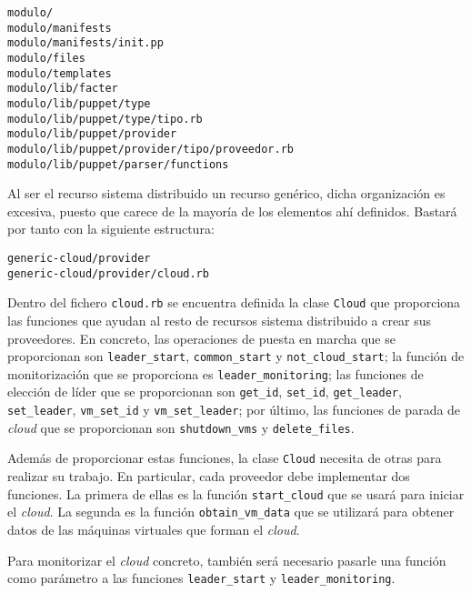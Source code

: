 \begin{lstlisting}
modulo/
modulo/manifests
modulo/manifests/init.pp
modulo/files
modulo/templates
modulo/lib/facter
modulo/lib/puppet/type
modulo/lib/puppet/type/tipo.rb
modulo/lib/puppet/provider
modulo/lib/puppet/provider/tipo/proveedor.rb
modulo/lib/puppet/parser/functions
\end{lstlisting}

Al ser el recurso sistema distribuido un recurso genérico, dicha organización es excesiva, puesto que carece de la mayoría de los elementos ahí definidos. Bastará por tanto con la siguiente estructura:

\begin{lstlisting}
generic-cloud/provider
generic-cloud/provider/cloud.rb
\end{lstlisting}

Dentro del fichero \texttt{cloud.rb} se encuentra definida la clase \texttt{Cloud} que proporciona las funciones que ayudan al resto de recursos sistema distribuido a crear sus proveedores. En concreto, las operaciones de puesta en marcha que se proporcionan son \texttt{leader\_start}, \texttt{common\_start} y \texttt{not\_cloud\_start}; la función de monitorización que se proporciona es \texttt{leader\_monitoring}; las funciones de elección de líder que se proporcionan son \texttt{get\_id}, \texttt{set\_id}, \texttt{get\_leader}, \texttt{set\_leader}, \texttt{vm\_set\_id} y \texttt{vm\_set\_leader}; por último, las funciones de parada de \emph{cloud} que se proporcionan son \texttt{shutdown\_vms} y \texttt{delete\_files}.

Además de proporcionar estas funciones, la clase \texttt{Cloud} necesita de otras para realizar su trabajo. En particular, cada proveedor debe implementar dos funciones. La primera de ellas es la función \texttt{start\_cloud} que se usará para iniciar el \emph{cloud}. La segunda es la función \texttt{obtain\_vm\_data} que se utilizará para obtener datos de las máquinas virtuales que forman el \emph{cloud}.

Para monitorizar el \emph{cloud} concreto, también será necesario pasarle una función como parámetro a las funciones \texttt{leader\_start} y \texttt{leader\_monitoring}.

